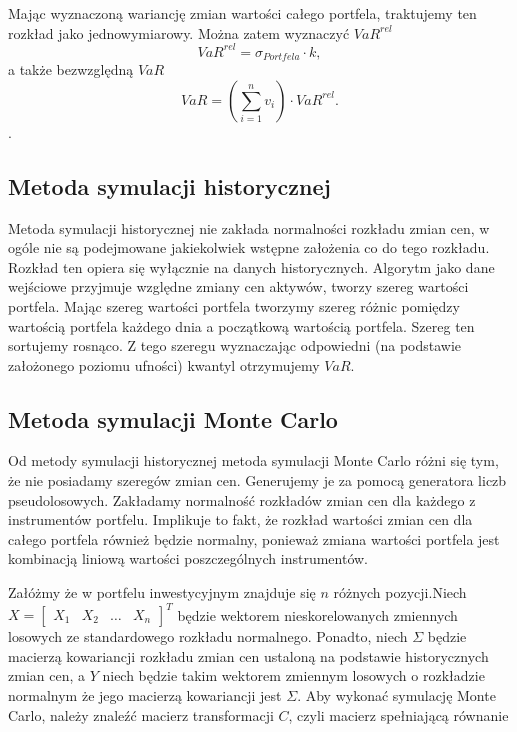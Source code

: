 \documentclass[11pt,titlepage]{article}
\numberwithin{equation}{section}
\begin{document}
Mając wyznaczoną wariancję zmian wartości całego portfela, traktujemy ten rozkład jako jednowymiarowy. Można zatem wyznaczyć $VaR^{rel}$
$$VaR^{rel}=\sigma_{Portfela} \cdot k,$$
a także bezwzględną $VaR$
$$VaR = (\sum_{i=1}^{n}v_i) \cdot VaR^{rel}.$$.



\subsection{Metoda symulacji historycznej}



Metoda symulacji historycznej nie zakłada normalności rozkładu zmian cen, w ogóle nie są podejmowane jakiekolwiek wstępne założenia co do tego rozkładu. Rozkład ten opiera się wyłącznie na danych historycznych. Algorytm jako dane wejściowe przyjmuje względne zmiany cen aktywów, tworzy szereg wartości portfela. Mając szereg wartości portfela tworzymy szereg różnic pomiędzy wartością portfela każdego dnia a początkową wartością portfela. Szereg ten sortujemy rosnąco. Z tego szeregu wyznaczając odpowiedni (na podstawie założonego poziomu ufności) kwantyl otrzymujemy $VaR$.\\



\subsection{Metoda symulacji Monte Carlo}


Od metody symulacji historycznej  metoda symulacji Monte Carlo różni się tym, że nie posiadamy szeregów zmian cen. Generujemy je za pomocą generatora liczb pseudolosowych. Zakładamy normalność rozkładów zmian cen dla każdego z instrumentów portfelu. Implikuje to fakt, że rozkład wartości zmian cen dla całego portfela również będzie normalny, ponieważ zmiana wartości portfela jest kombinacją liniową wartości poszczególnych instrumentów. 

Załóżmy że w portfelu inwestycyjnym znajduje się $n$ różnych pozycji.Niech $X=\begin{bmatrix}
 X_1 & X_2 & \hdots & X_n
\end{bmatrix}^T $ będzie wektorem nieskorelowanych zmiennych losowych ze standardowego rozkładu normalnego. Ponadto, niech $\Sigma$ będzie macierzą kowariancji rozkładu zmian cen ustaloną na podstawie historycznych zmian cen, a $Y$ niech będzie takim wektorem zmiennym losowych o rozkładzie normalnym że jego macierzą kowariancji jest $\Sigma$. Aby wykonać symulację Monte Carlo, należy znaleźć macierz transformacji $C$, czyli macierz spełniającą równanie 
\end{document}
